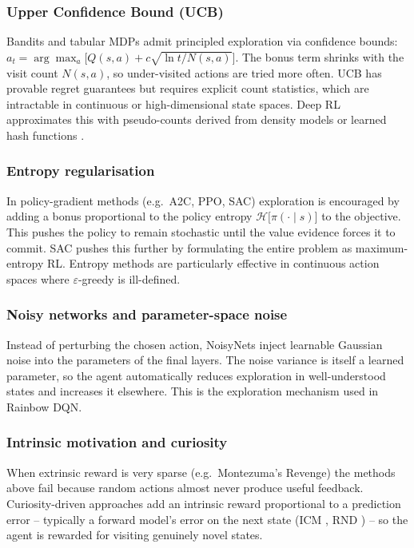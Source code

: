 \documentclass[11pt,a4paper]{article}
\begin{document}
\subsubsection{Upper Confidence Bound (UCB)}
Bandits and tabular MDPs admit principled exploration via confidence
bounds:
$a_t = \arg\max_a \bigl[Q(s, a) + c\sqrt{\ln t / N(s, a)}\bigr]$.
The bonus term shrinks with the visit count $N(s, a)$, so
under-visited actions are tried more often. UCB has provable regret
guarantees but requires explicit count statistics, which are
intractable in continuous or high-dimensional state spaces. Deep RL
approximates this with pseudo-counts derived from density models or
learned hash functions \cite{burda2019rnd}.

\subsubsection{Entropy regularisation}
In policy-gradient methods (e.g.\ A2C, PPO, SAC) exploration is
encouraged by adding a bonus proportional to the policy entropy
$\mathcal{H}\bigl[\pi(\cdot \mid s)\bigr]$ to the objective. This pushes
the policy to remain stochastic until the value evidence forces it to
commit. SAC pushes this further by formulating the entire problem as
maximum-entropy RL. Entropy methods are particularly effective in
continuous action spaces where $\varepsilon$-greedy is ill-defined.

\subsubsection{Noisy networks and parameter-space noise}
Instead of perturbing the chosen action, NoisyNets \cite{fortunato2018}
inject learnable Gaussian noise into the parameters of the final
layers. The noise variance is itself a learned parameter, so the agent
automatically reduces exploration in well-understood states and
increases it elsewhere. This is the exploration mechanism used in
Rainbow DQN.

\subsubsection{Intrinsic motivation and curiosity}
When extrinsic reward is very sparse (e.g.\ Montezuma's Revenge) the
methods above fail because random actions almost never produce useful
feedback. Curiosity-driven approaches add an intrinsic reward
proportional to a prediction error -- typically a forward model's error
on the next state (ICM \cite{pathak2017}, RND \cite{burda2019rnd}) --
so the agent is rewarded for visiting genuinely novel states.
\end{document}

